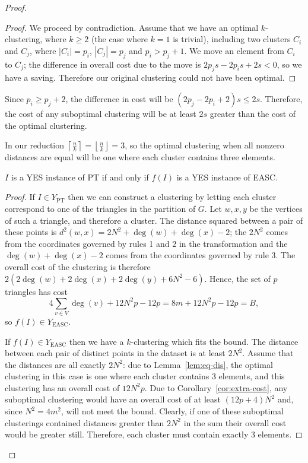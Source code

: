 \begin{proof}
\begin{proof}
    We proceed by contradiction.  Assume that we have an optimal
    $k$-clustering, where $k \geq 2$ (the case where $k=1$ is trivial),
    including two clusters $C_i$ and $C_j$, where $|C_i| = p_i$, $|C_j| = p_j$
    and $p_i > p_j + 1$.  We move an element from $C_i$ to $C_j$; the
    difference in overall cost due to the move is $2p_js - 2p_is + 2s < 0$, so
    we have a saving.  Therefore our original clustering could not have been
    optimal.
  \end{proof}

  \begin{cor}
    \label{cor:extra-cost}
    Since $p_i \geq p_j + 2$, the difference in cost will be $(2p_j - 2p_i +
    2)s \leq 2s$.  Therefore, the cost of any suboptimal clustering will be at
    least $2s$ greater than the cost of the optimal clustering.
  \end{cor}

  In our reduction $\left\lceil \frac{n}{k} \right\rceil = \left\lfloor
    \frac{n}{k} \right\rfloor = 3$, so the optimal clustering when all nonzero
  distances are equal will be one where each cluster contains three elements.

  \begin{lem}
    \label{lem:euclidean-iff}
    $I$ is a YES instance of PT if and only if $f(I)$ is a YES instance of EASC.
  \end{lem}

  \begin{proof}
    If $I \in Y_{\text{PT}}$ then we can construct a clustering by letting
    each cluster correspond to one of the triangles in the partition of $G$.
    Let $w,x,y$ be the vertices of such a triangle, and therefore a cluster.
    The distance squared between a pair of these points is $d^2(w,x) =
    2N^2+\deg(w)+\deg(x)-2$; the $2N^2$ comes from the coordinates governed by
    rules 1 and 2 in the transformation and the $\deg(w) + \deg(x) - 2$ comes
    from the coordinates governed by rule 3.  The overall cost of the
    clustering is therefore $2(2\deg(w)+2\deg(x)+2\deg(y)+6N^2-6)$.  Hence,
    the set of $p$ triangles has cost
    \begin{equation}
      \label{eq:tri-cost}
      4\sum_{v \in V} \deg(v) + 12N^2p - 12p = 8m + 12N^2p - 12p = B,
    \end{equation}
    so $f(I) \in Y_{\text{EASC}}$.

    If $f(I) \in Y_{\text{EASC}}$ then we have a $k$-clustering which fits the
    bound.  The distance between each pair of distinct points in the dataset
    is at least $2N^2$.  Assume that the distances are all exactly $2N^2$: due
    to Lemma~\ref{lem:eq-dis}, the optimal clustering in this case is one
    where each cluster contains 3 elements, and this clustering has an overall
    cost of $12N^2p$.  Due to Corollary~\ref{cor:extra-cost}, any suboptimal
    clustering would have an overall cost of at least $(12p+4)N^2$ and, since
    $N^2=4m^2$, will not meet the bound.  Clearly, if one of these suboptimal
    clusterings contained distances greater than $2N^2$ in the sum their
    overall cost would be greater still.  Therefore, each cluster must contain
    exactly 3 elements.


\end{proof}
\end{proof}

